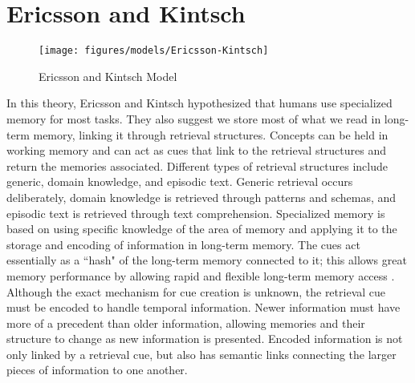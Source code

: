 \section{Ericsson and Kintsch}
\begin{figure}[htp]
	\begin{center}
		\texttt{[image: figures/models/Ericsson-Kintsch]}
		\caption{Ericsson and Kintsch Model}
	\end{center}
	\label{fig:EK_MODEL}
\end{figure}
In this theory, Ericsson and Kintsch \cite{LTM} hypothesized that humans use specialized memory for most tasks.  They also suggest we store most of what we read in long-term memory, linking it through retrieval structures.  Concepts can be held in working memory and can act as cues that link to the retrieval structures and return the memories associated.  Different types of retrieval structures include generic, domain knowledge, and episodic text.  Generic retrieval occurs deliberately, domain knowledge is retrieved through patterns and schemas, and episodic text is retrieved through text comprehension. Specialized memory is based on using specific knowledge of the area of memory and applying it to the storage and encoding of information in long-term memory. The cues act essentially as a ``hash" of the long-term memory connected to it; this allows great memory performance by allowing rapid and flexible long-term memory access \cite{LTM}.  Although the exact mechanism for cue creation is unknown, the retrieval cue must be encoded to handle temporal information.  Newer information must have more of a precedent than older information, allowing memories and their structure to change as new information is presented.  Encoded information is not only linked by a retrieval cue, but also has semantic links connecting the larger pieces of information to one another.

